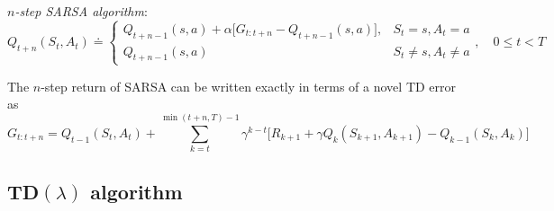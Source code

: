 \textit{\( n \)-step SARSA algorithm}:
\begin{equation}
    Q_{t+n}(S_t, A_t)
    \doteq
    \begin{cases}
        Q_{t+n-1}(s, a) + \alpha \Big[ G_{t:t+n} - Q_{t+n-1}(s, a) \Big],
         &
        S_t = s, A_t = a
        \\
        Q_{t+n-1}(s, a)
         &
        S_t \neq s, A_t \neq a
    \end{cases}
    , \quad 0 \leq t < T
\end{equation}

The \( n \)-step return of SARSA can be written exactly in terms of a novel TD error as
\begin{equation}
    G_{t:t+n} = Q_{t-1}(S_t, A_t) + \sum_{k = t}^{\min(t+n, T)-1} \gamma^{k-t} \big[ R_{k+1} + \gamma Q_{k}(S_{k+1}, A_{k+1}) - Q_{k-1}(S_k, A_k) \big]
\end{equation}

\subsection{TD\texorpdfstring{\( (\lambda) \)}{ (lambda) } algorithm}
